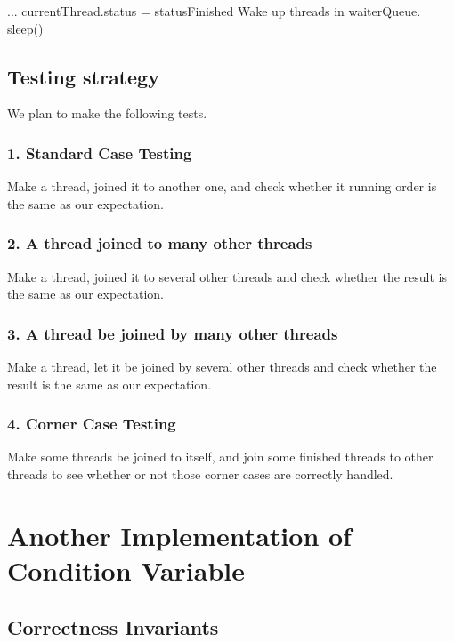 \documentclass{article}
\begin{document}
	\begin{algorithm}[H]
		\begin{algorithmic}
				\State ...
				\State currentThread.status = statusFinished
				\State Wake up threads in waiterQueue.
				\State sleep()
			\EndProcedure
		\end{algorithmic}
	\end{algorithm}
	
	
	\subsection{Testing strategy}
	
	We plan to make the following tests.
	\subsubsection*{1. Standard Case Testing}
	Make a thread, joined it to another one, and check whether it running order is the same as our expectation.
	
	\subsubsection*{2. A thread joined to many other threads}
	Make a thread, joined it to several other threads and check whether the result is the same as our expectation.
	
	\subsubsection*{3. A thread be joined by many other threads}
	Make a thread, let it be joined by several other threads and check whether the result is the same as our expectation.
	
	\subsubsection*{4. Corner Case Testing}
	Make some threads be joined to itself, and join some finished threads to other threads to see whether or not those corner cases are correctly handled.
	
	\newpage
	
	\section{Another Implementation of Condition Variable}
	
	\subsection{Correctness Invariants}
	
\end{document}
